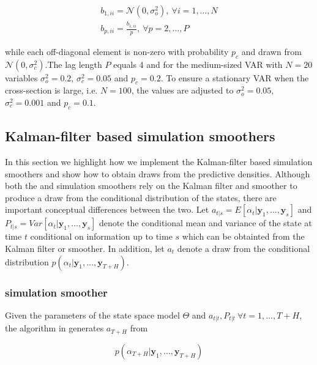 \documentclass[notitlepage,a4paper,12pt]{article}
\begin{document}
\begin{subequations}
    \begin{align}
        b_{1, ii} = \mathcal{N}(0, \sigma^2_o), \: \forall i = 1, \dots, N \\
b_{p, ii} = \frac{b_{1,ii}}{p}, \: \forall p = 2, \dots, P
    \end{align}    
\end{subequations}

\noindent while each off-diagonal element is non-zero with probability $p_c$ and drawn from $\mathcal{N}(0, \sigma^2_c)$.The lag length $P$ equals 4 and for the medium-sized VAR with $N=20$ variables $\sigma^2_o = 0.2 $, $\sigma^2_c = 0.05$ and $p_c = 0.2$. To ensure a stationary VAR when the cross-section is large, i.e. $N=100$, the values are adjusted to $\sigma^2_o = 0.05 $, $\sigma^2_c = 0.001$ and $p_c = 0.1$.

\subsection{Kalman-filter based simulation smoothers}

In this section we highlight how we implement the Kalman-filter based simulation smoothers and show how to obtain draws from the predictive densities. Although both the \citet{carterkohn1994_biomtr} and \citet{durbinkoopman2002_biomtr} simulation smoothers rely on the Kalman filter and smoother to produce a draw from the conditional distribution of the states, there are important conceptual differences between the two. Let $a_{t|s} = E[\alpha_t|\mathbf{y}_1, \dots, \mathbf{y}_s]$ and $P_{t|s} = Var[\alpha_t|\mathbf{y}_1, \dots, \mathbf{y}_s]$ denote the conditional mean and variance of the state at time $t$ conditional on information up to time $s$ which can be obtainted from the Kalman filter or smoother. In addition, let $a_t$ denote a draw from the conditional distribution $p(\alpha_t | \mathbf{y}_1, \dots, \mathbf{y}_{T+H})$. 

\subsubsection{\citet{carterkohn1994_biomtr} simulation smoother}

Given the parameters of the state space model $\Theta$ and  $a_{t|t}, P_{t|t} \: \forall t = 1, \dots, T+H$, the algorithm in \citet{carterkohn1994_biomtr} generates $a_{T+H}$ from 

$$
p(\alpha_{T+H}|\mathbf{y}_1, \dots, \mathbf{y}_{T+H})
$$
\end{document}
